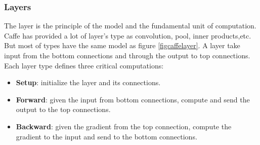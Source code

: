 \subsubsection{Layers}
The layer is the principle of the model and the fundamental unit of computation. Caffe has provided a lot of layer's type as convolution, pool, inner products,etc. But most of types have the same model as figure \ref{figcaffelayer}. A layer take input from the bottom connections and through the output to top connections. Each layer type defines three critical computations:
\begin{itemize}
	\item \textbf{Setup}: initialize the layer and its connections.
	\item \textbf{Forward}:  given the input from bottom connections, compute and send the output to the top connections.
	\item \textbf{Backward}: given the gradient from the top connection, compute the gradient to the input and send to the bottom connections.
\end{itemize}
